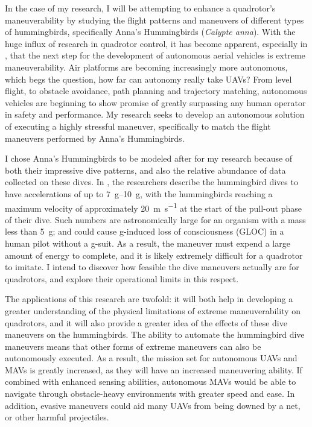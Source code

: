 \documentclass[onecolumn,10pt]{IEEEtran}
\newcommand{\Calypteanna}{\emph{Calypte anna}}
\begin{document}
In the case of my research, I will be attempting to enhance a quadrotor’s maneuverability by studying the flight patterns and maneuvers of different types of hummingbirds, specifically Anna’s Hummingbirds (\Calypteanna). With the huge influx of research in quadrotor control, it has become apparent, especially in \cite{mellinger2011minimum, greiff2017modelling}, that the next step for the development of autonomous aerial vehicles is extreme maneuverability. Air platforms are becoming increasingly more autonomous, which begs the question, how far can autonomy really take UAVs? From level flight, to obstacle avoidance, path planning and trajectory matching, autonomous vehicles are beginning to show promise of greatly surpassing any human operator in safety and performance. My research seeks to develop an autonomous solution of executing a highly stressful maneuver, specifically to match the flight maneuvers performed by Anna’s Hummingbirds. 

I chose Anna’s Hummingbirds to be modeled after for my research because of both their impressive dive patterns, and also the relative abundance of data collected on these dives. In \cite{larimer1995accelerational}, the researchers describe the hummingbird dives to have accelerations of up to \SIrange{7}{10}{g}, with the hummingbirds reaching a maximum velocity of approximately \SI{20}{\meter\per\second} at the start of the pull-out phase of their dive. Such numbers are astronomically large for an organism with a mass less than \SI{5}{\gram}; and could cause g-induced loss of consciousness (GLOC) in a human pilot without a g-suit. As a result, the maneuver must expend a large amount of energy to complete, and it is likely extremely difficult for a quadrotor to imitate. I intend to discover how feasible the dive maneuvers actually are for quadrotors, and explore their operational limits in this respect. 

The applications of this research are twofold: it will both help in developing a greater understanding of the physical limitations of extreme maneuverability on quadrotors, and it will also provide a greater idea of the effects of these dive maneuvers on the hummingbirds. The ability to automate the hummingbird dive maneuvers means that other forms of extreme maneuvers can also be autonomously executed. As a result, the mission set for autonomous UAVs and MAVs is greatly increased, as they will have an increased maneuvering ability. If combined with enhanced sensing abilities, autonomous MAVs would be able to navigate through obstacle-heavy environments with greater speed and ease. In addition, evasive maneuvers could aid many UAVs from being downed by a net, or other harmful projectiles. 
\end{document}
